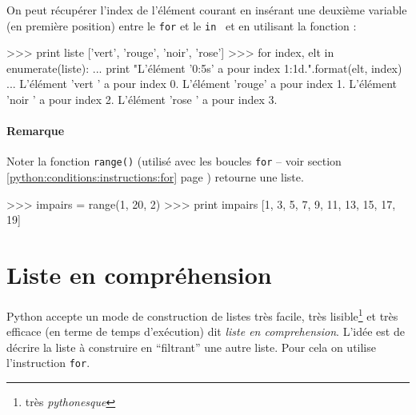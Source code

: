 On peut récupérer l'index de l'élément courant en insérant une deuxième variable (en première position) entre le \texttt{for} et le \texttt{in}~ et en utilisant la fonction :
\begin{pythoncode}
>>> print liste
['vert', 'rouge', 'noir', 'rose']
>>> for index, elt in enumerate(liste):
...    print "L'élément '{0:5s}' a pour index {1:1d}.".format(elt, index)
...
L'élément 'vert ' a pour index 0.
L'élément 'rouge' a pour index 1.
L'élément 'noir ' a pour index 2.
L'élément 'rose ' a pour index 3.
\end{pythoncode}


\paragraph{Remarque}

\begin{remarque}
Noter la fonction \texttt{range()} (utilisé avec les boucles \texttt{for} -- voir section
\ref{python:conditions:instructions:for} page \pageref{python:conditions:instructions:for})
retourne une liste.
\begin{pythoncode}
>>> impairs = range(1, 20, 2)
>>> print impairs
[1, 3, 5, 7, 9, 11, 13, 15, 17, 19]
\end{pythoncode}
\end{remarque}


\section{Liste en compréhension}
Python accepte un mode de construction de listes très facile, très lisible\footnote{très \textit{pythonesque}} et très efficace (en terme de temps d'exécution) dit \textit{liste en comprehension}. L'idée est de décrire la liste à construire en ``filtrant'' une autre liste. Pour cela on utilise l'instruction \texttt{for}.


